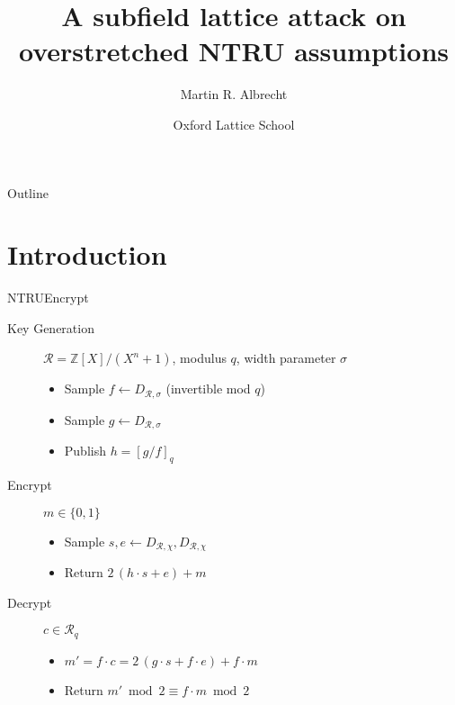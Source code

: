\documentclass[presentation,smaller]{beamer}
\author{Martin R. Albrecht}
\date{Oxford Lattice School}
\title{A subfield lattice attack on overstretched NTRU assumptions}
\newcommand{\cR}{\ensuremath{\mathcal{R}}\xspace}
\newcommand{\Z}{\ensuremath{\mathbb Z}\xspace}
\begin{document}
\maketitle
\begin{frame}{Outline}
\tableofcontents
\end{frame}


\section{Introduction}
\label{sec:org4aee7db}

\begin{frame}[label={sec:org40b5023}]{NTRUEncrypt}
\begin{description}
\item[{Key Generation}] \(\cR = \Z[X]/(X^n+1)\), modulus \(q\), width parameter \(σ\)
\begin{itemize}
\item Sample \(f \gets D_{\cR, σ}\) (invertible mod \(q\))
\item Sample \(g \gets D_{\cR, σ}\)
\item Publish \(h = {[g/f]}_q\)
\end{itemize}

\item[{Encrypt}] \(m ∈ \{0,1\}\)
\begin{itemize}
\item Sample \(s,e \gets D_{\cR,χ}, D_{\cR,χ}\)
\item Return \(2\, (h ⋅ s + e) + m\)
\end{itemize}

\item[{Decrypt}] \(c ∈ \cR_q\)
\begin{itemize}
\item \(m' = f ⋅ c = 2\, (g ⋅ s + f ⋅ e) + f ⋅ m\)
\item Return  \(m' \bmod 2 ≡ f ⋅ m \bmod 2\)
\end{itemize}
\end{description}

\end{frame}
\end{document}
